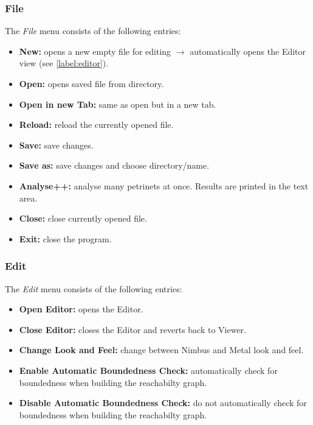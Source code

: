 \documentclass[10pt, a4paper]{article}
\begin{document}
\subsubsection{File}
\label{label:file}
The \textit{File} menu consists of the following entries:

\begin{itemize}

\item \textbf{New:} opens a new empty file for editing $\rightarrow$ automatically opens the Editor view (see \ref{label:editor}). 
\item \textbf{Open:} opens saved file from directory.
\item \textbf{Open in new Tab:} same as open but in a new tab.
\item \textbf{Reload:} reload the currently opened file.
\item \textbf{Save:} save changes.
\item \textbf{Save as:} save changes and choose directory/name.
\item \textbf{Analyse++:} analyse many petrinets at once. Results are printed in the text area.
\item \textbf{Close:} close currently opened file.
\item \textbf{Exit:} close the program.

\end{itemize}


\subsubsection{Edit}


The \textit{Edit} menu consists of the following entries:


\begin{itemize}
\item \textbf{Open Editor:} opens the Editor.
\item \textbf{Close Editor:} closes the Editor and reverts back to Viewer.
\item \textbf{Change Look and Feel:} change between Nimbus and Metal look and feel.
\item \textbf{Enable Automatic Boundedness Check:} automatically check for boundedness when building the reachabilty graph.
\item \textbf{Disable Automatic Boundedness Check:} do not automatically check for boundedness when building the reachabilty graph.
\end{itemize}
\end{document}
